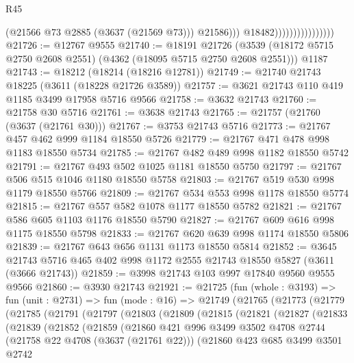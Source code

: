\begin{lexlean}{R45}
\begin{coremodule}
                                          (@21566 @73 @2885 (@3637 (@21569 @73)))
                                          @21586)))
                                    @18482))))))))))))))))
@21726 := @12767 @9555
@21740 := @18191
    @21726
    (@3539 (@18172 @5715 @2750 @2608 @2551) (@4362 (@18095 @5715 @2750 @2608 @2551)))
    @1187
@21743 := @18212 (@18214 (@18216 @12781))
@21749 := @21740 @21743 @18225 (@3611 (@18228 @21726 @3589))
@21757 := @3621 @21743 @110 @419 @1185 @3499 @17958 @5716 @9566
@21758 := @3632 @21743
@21760 := @21758 @30 @5716
@21761 := @3638 @21743
@21765 := @21757 (@21760 (@3637 (@21761 @30)))
@21767 := @3753 @21743 @5716
@21773 := @21767 @457 @462 @999 @1184 @18550 @5726
@21779 := @21767 @471 @478 @998 @1183 @18550 @5734
@21785 := @21767 @482 @489 @998 @1182 @18550 @5742
@21791 := @21767 @493 @502 @1025 @1181 @18550 @5750
@21797 := @21767 @506 @515 @1046 @1180 @18550 @5758
@21803 := @21767 @519 @530 @998 @1179 @18550 @5766
@21809 := @21767 @534 @553 @998 @1178 @18550 @5774
@21815 := @21767 @557 @582 @1078 @1177 @18550 @5782
@21821 := @21767 @586 @605 @1103 @1176 @18550 @5790
@21827 := @21767 @609 @616 @998 @1175 @18550 @5798
@21833 := @21767 @620 @639 @998 @1174 @18550 @5806
@21839 := @21767 @643 @656 @1131 @1173 @18550 @5814
@21852 := @3645 @21743 @5716 @465 @402 @998 @1172 @2555 @21743 @18550 @5827 (@3611 (@3666 @21743))
@21859 := @3998 @21743 @103 @997 @17840 @9560 @9555 @9566
@21860 := @3930 @21743
@21921 := @21725
    (fun (whole : @3193) =>
    fun (unit : @2731) =>
    fun (mode : @16) =>
    @21749
      (@21765
        (@21773
          (@21779
            (@21785
              (@21791
                (@21797
                  (@21803
                    (@21809
                      (@21815
                        (@21821
                          (@21827
                            (@21833
                              (@21839
                                (@21852
                                  (@21859
                                    (@21860
                                      @421
                                      @996
                                      @3499
                                      @3502
                                      @4708
                                      @2744
                                      (@21758 @22 @4708 (@3637 (@21761 @22)))
                                      (@21860
                                        @423
                                        @685
                                        @3499
                                        @3501
                                        @2742

\end{coremodule}
\end{lexlean}
